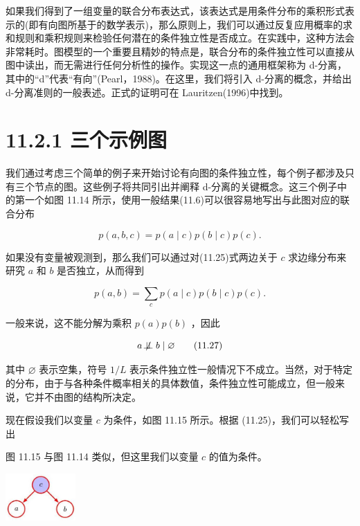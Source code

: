 \documentclass[10pt]{article}
\begin{document}
如果我们得到了一组变量的联合分布表达式，该表达式是用条件分布的乘积形式表示的(即有向图所基于的数学表示)，那么原则上，我们可以通过反复应用概率的求和规则和乘积规则来检验任何潜在的条件独立性是否成立。在实践中，这种方法会非常耗时。图模型的一个重要且精妙的特点是，联合分布的条件独立性可以直接从图中读出，而无需进行任何分析性的操作。实现这一点的通用框架称为 d-分离，其中的“d”代表“有向”(Pearl，1988)。在这里，我们将引入 d-分离的概念，并给出 d-分离准则的一般表述。正式的证明可在 Lauritzen(1996)中找到。

\section*{11.2.1 三个示例图}

我们通过考虑三个简单的例子来开始讨论有向图的条件独立性，每个例子都涉及只有三个节点的图。这些例子将共同引出并阐释 d-分离的关键概念。这三个例子中的第一个如图 11.14 所示，使用一般结果(11.6)可以很容易地写出与此图对应的联合分布

\[
p\left( {a,b,c}\right)  = p\left( {a \mid  c}\right) p\left( {b \mid  c}\right) p\left( c\right) . \tag{11.25}
\]

如果没有变量被观测到，那么我们可以通过对(11.25)式两边关于 \(c\) 求边缘分布来研究 \(a\) 和 \(b\) 是否独立，从而得到

\[
p\left( {a,b}\right)  = \mathop{\sum }\limits_{c}p\left( {a \mid  c}\right) p\left( {b \mid  c}\right) p\left( c\right) . \tag{11.26}
\]

一般来说，这不能分解为乘积 \(p\left( a\right) p\left( b\right)\) ，因此

\[
a \mathrel{ \not \! \perp \!\!\! \perp } b \mid  \varnothing  \tag{11.27}
\]

其中 \(\varnothing\) 表示空集，符号 \(1/L\) 表示条件独立性一般情况下不成立。当然，对于特定的分布，由于与各种条件概率相关的具体数值，条件独立性可能成立，但一般来说，它并不由图的结构所决定。

现在假设我们以变量 \(c\) 为条件，如图 11.15 所示。根据 (11.25)，我们可以轻松写出

图 11.15 与图 11.14 类似，但这里我们以变量 \(c\) 的值为条件。

\begin{center}
\includegraphics[max width=0.2\textwidth]{images/0194e279-9b28-703a-88f4-c3ac21e2010d_358_1287_347_264_179_0.jpg}
\end{center}
\hspace*{3em} 
\end{document}
